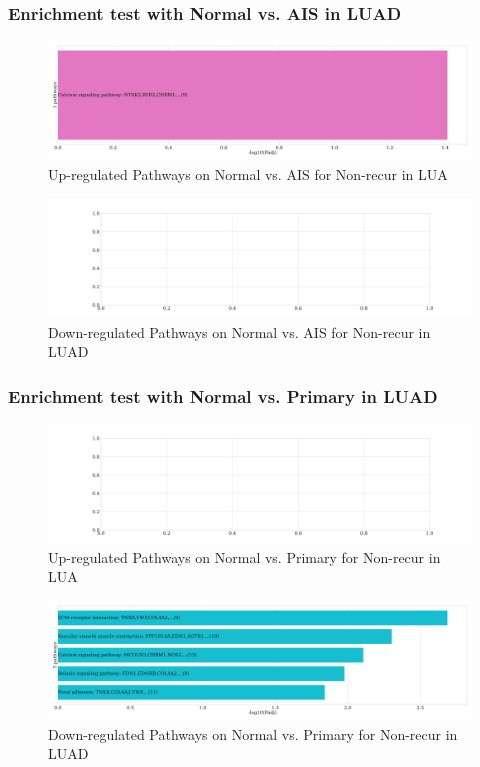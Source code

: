 \documentclass{beamer}
\begin{document}
    \begin{frame}
        \frametitle{Enrichment test with Normal vs. AIS in LUAD}

        \begin{figure}
            \includegraphics[width=0.8 \linewidth]{figures/DEG/Enrichment/STAR.ADC.Nonrecur.Normal-AIS.Up.KEGG.pdf}
            \caption{Up-regulated Pathways on Normal vs. AIS for Non-recur in LUA}
        \end{figure}

        \begin{figure}
            \includegraphics[width=0.8 \linewidth]{figures/DEG/Enrichment/STAR.ADC.Nonrecur.Normal-AIS.Down.KEGG.pdf}
            \caption{Down-regulated Pathways on Normal vs. AIS for Non-recur in LUAD}
        \end{figure}
    \end{frame}

    \begin{frame}
        \frametitle{Enrichment test with Normal vs. Primary in LUAD}

        \begin{figure}
            \includegraphics[width=0.8 \linewidth]{figures/DEG/Enrichment/STAR.ADC.Nonrecur.Normal-Primary.Up.KEGG.pdf}
            \caption{Up-regulated Pathways on Normal vs. Primary for Non-recur in LUA}
        \end{figure}

        \begin{figure}
            \includegraphics[width=0.8 \linewidth]{figures/DEG/Enrichment/STAR.ADC.Nonrecur.Normal-Primary.Down.KEGG.pdf}
            \caption{Down-regulated Pathways on Normal vs. Primary for Non-recur in LUAD}
        \end{figure}
    \end{frame}
\end{document}
